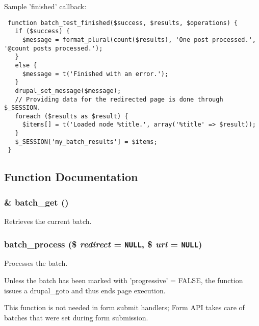 Sample 'finished' callback: 

\begin{Code}\begin{verbatim} function batch_test_finished($success, $results, $operations) {
   if ($success) {
     $message = format_plural(count($results), 'One post processed.', '@count posts processed.');
   }
   else {
     $message = t('Finished with an error.');
   }
   drupal_set_message($message);
   // Providing data for the redirected page is done through $_SESSION.
   foreach ($results as $result) {
     $items[] = t('Loaded node %title.', array('%title' => $result));
   }
   $_SESSION['my_batch_results'] = $items;
 }
\end{verbatim}
\end{Code}

 

\subsection{Function Documentation}
\hypertarget{group__batch_g971f5246c6e8e536d0b20529fb2e2638}{
\subsubsection[{batch\_\-get}]{\setlength{\rightskip}{0pt plus 5cm}\& batch\_\-get ()}}
\label{group__batch_g971f5246c6e8e536d0b20529fb2e2638}


Retrieves the current batch. \hypertarget{group__batch_g35560f242c9a5da0d136e652d4d1da47}{
\subsubsection[{batch\_\-process}]{\setlength{\rightskip}{0pt plus 5cm}batch\_\-process (\$ {\em redirect} = {\tt NULL}, \/  \$ {\em url} = {\tt NULL})}}
\label{group__batch_g35560f242c9a5da0d136e652d4d1da47}


Processes the batch.

Unless the batch has been marked with 'progressive' = FALSE, the function issues a drupal\_\-goto and thus ends page execution.

This function is not needed in form submit handlers; Form API takes care of batches that were set during form submission.

